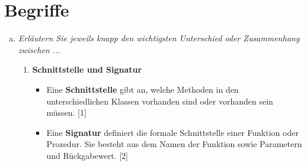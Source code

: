 

\newcommand{\dozent}{Lutz Prechelt}
\newcommand{\tutor}{Samuel Domiks}
\newcommand{\tutoriumNo}{02\\Materialien: Latex, Skript}
\newcommand{\ubungNo}{08}
\newcommand{\veranstaltung}{Softwaretechnik}
\newcommand{\semester}{SoSe21}
\newcommand{\studenten}{Jonny Lam \& Thore Brehmer}




\section{Begriffe}
\begin{enumerate}[(a)]
    \item {\itshape Erläutern Sie jeweils knapp den wichtigsten Unterschied oder Zusammenhang zwischen ...}
    \begin{enumerate}[1.]
        \item \textbf{Schnittstelle und Signatur}
        \begin{itemize}
            \item Eine \textbf{Schnittstelle} gibt an, welche Methoden in den unterschiedlichen Klassen vorhanden sind oder vorhanden sein müssen. [1]
            \item Eine \textbf{Signatur} definiert die formale Schnittstelle einer Funktion oder Prozedur. Sie besteht aus dem Namen der Funktion sowie Parametern und Rückgabewert. [2]
        \end{itemize}
        
            

\end{enumerate}
\end{enumerate}
